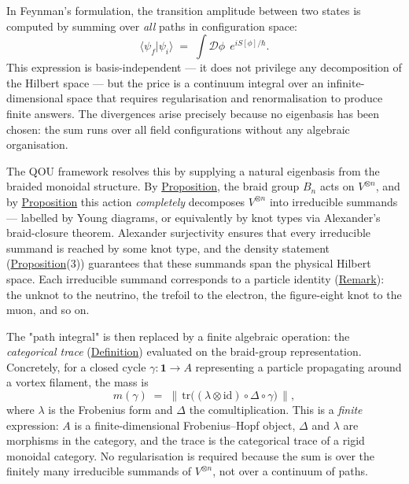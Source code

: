 \begin{remark}
  \label{rem:feynman-eigenbasis}
In Feynman's formulation, the transition amplitude between two states is
computed by summing over \emph{all} paths in configuration space:
\[
\langle\psi_f|\psi_i\rangle
  \;=\;
  \int \mathcal{D}\phi\;\,e^{iS[\phi]/\hbar}.
\]
This expression is basis-independent --- it does not privilege any
decomposition of the Hilbert space --- but the price is a
continuum integral over an infinite-dimensional space that requires
regularisation and renormalisation to produce finite answers.  The
divergences arise precisely because no eigenbasis has been chosen: the sum
runs over all field configurations without any algebraic organisation.

The QOU framework resolves this by supplying a natural eigenbasis from the
braided monoidal structure.  By
\hyperref[prop:braid-action-tensor]{Proposition}, the braid group $B_n$ acts on
$V^{\otimes n}$, and by
\hyperref[prop:knot-eigenbasis-complete]{Proposition} this action
\emph{completely} decomposes $V^{\otimes n}$ into irreducible summands ---
labelled by Young diagrams, or equivalently by knot types via Alexander's
braid-closure theorem.  Alexander surjectivity ensures that every
irreducible summand is reached by some knot type, and the density statement
(\hyperref[prop:knot-eigenbasis-complete]{Proposition}(3)) guarantees that these
summands span the physical Hilbert space.  Each irreducible summand
corresponds to a particle identity
(\hyperref[rem:skein-decomposition]{Remark}): the unknot to the neutrino, the
trefoil to the electron, the figure-eight knot to the muon, and so on.

The "path integral" is then replaced by a finite algebraic operation:
the \emph{categorical trace}
(\hyperref[def:mass-identity]{Definition}) evaluated on the braid-group
representation.  Concretely, for a closed cycle
$\gamma \colon \mathbf{1} \to A$ representing a particle propagating
around a vortex filament, the mass is
\[
m(\gamma)
  \;=\;
  \bigl\lVert\,
  \mathrm{tr}\bigl(
    (\lambda \otimes \mathrm{id})
    \circ \Delta
    \circ \gamma
  \bigr)
  \,\bigr\rVert,
\]
where $\lambda$ is the Frobenius form and $\Delta$ the comultiplication.
This is a \emph{finite} expression: $A$ is a finite-dimensional
Frobenius--Hopf object, $\Delta$ and $\lambda$ are morphisms in the
category, and the trace is the categorical trace of a rigid monoidal
category.  No regularisation is required because the sum is over the
finitely many irreducible summands of $V^{\otimes n}$, not over a
continuum of paths.


\end{remark}
